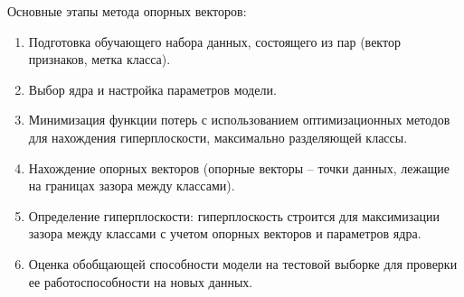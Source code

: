 Основные этапы метода опорных векторов:
\begin{enumerate}[label=\arabic*.]
	\item Подготовка обучающего набора данных, состоящего из пар (вектор признаков, метка класса).
	\item Выбор ядра и настройка параметров модели.
	\item Минимизация функции потерь с использованием оптимизационных методов для нахождения гиперплоскости, максимально разделяющей классы.
	\item Нахождение опорных векторов (опорные векторы -- точки данных, лежащие на границах зазора между классами).
	\item Определение гиперплоскости: гиперплоскость строится для максимизации зазора между классами с учетом опорных векторов и параметров ядра.
	\item Оценка обобщающей способности модели на тестовой выборке для проверки ее работоспособности на новых данных.
\end{enumerate}
